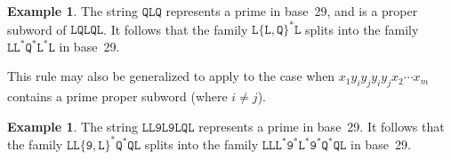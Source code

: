 \documentclass[12pt]{article}
\theoremstyle{plain}
\theoremstyle{definition}
\newtheorem{example}[theorem]{Example}
\newcommand{\0}{\mathtt{0}}
\newcommand{\1}{\mathtt{1}}
\newcommand{\2}{\mathtt{2}}
\newcommand{\3}{\mathtt{3}}
\newcommand{\4}{\mathtt{4}}
\newcommand{\5}{\mathtt{5}}
\newcommand{\6}{\mathtt{6}}
\newcommand{\7}{\mathtt{7}}
\newcommand{\8}{\mathtt{8}}
\newcommand{\9}{\mathtt{9}}
\begin{document}
\begin{example}
The string $\mathtt{QLQ}$ represents a prime in base~29, and is a proper subword of $\mathtt{LQLQL}$.
It follows that the family $\mathtt{L}\{\mathtt{L},\mathtt{Q}\}^*\mathtt{L}$ splits into the family $\mathtt{L}\mathtt{L}^*\mathtt{Q}^*\mathtt{L}^*\mathtt{L}$ in base~29.
\end{example}
This rule may also be generalized to apply to the case when $x_1y_iy_jy_iy_jx_2\dotsm x_m$ contains a prime proper subword (where $i\neq j$).
\begin{example}
The string $\mathtt{LL9L9LQL}$ represents a prime in base~29.  It follows that the family $\mathtt{LL\{\mathtt{9},\mathtt{L}\}^*\mathtt{Q}^*\mathtt{QL}}$ splits into the family $\mathtt{LL\mathtt{L}^*\mathtt{9}^*\mathtt{L}^*\mathtt{9}^*\mathtt{Q}^*\mathtt{QL}}$ in base~29.
\end{example}
\end{document}
